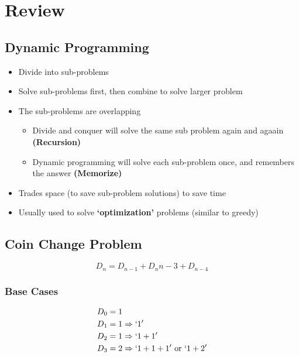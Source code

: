 \documentclass{article}
\begin{document}
\section*{Review}
\subsection*{Dynamic Programming}
\begin{itemize}
    \item Divide into sub-problems
    \item Solve sub-problems first, then combine to solve larger problem
    \item The sub-problems are overlapping
          \begin{itemize}
              \item Divide and conquer will solve the same sub problem again and agaain \textbf{(Recursion)}
              \item Dynamic programming will solve each sub-problem once, and remembers the answer \textbf{(Memorize)}
          \end{itemize}
    \item Trades space (to save sub-problem solutions) to save time
    \item Usually used to solve \textbf{`optimization'} problems (similar to greedy)
\end{itemize}

\subsection*{Coin Change Problem}

\begin{equation*}
    D_n = D_{n-1} + D_n{n-3} + D_{n-4}
\end{equation*}

\subsubsection*{Base Cases}
\begin{align*}
    D_0 & = 1                                             \\
    D_1 & = 1 \Rightarrow `1'                             \\
    D_2 & = 1 \Rightarrow `1 + 1'                         \\
    D_3 & = 2 \Rightarrow `1 + 1 + 1' \text{ or } `1 + 2' \\
\end{align*}
\end{document}
